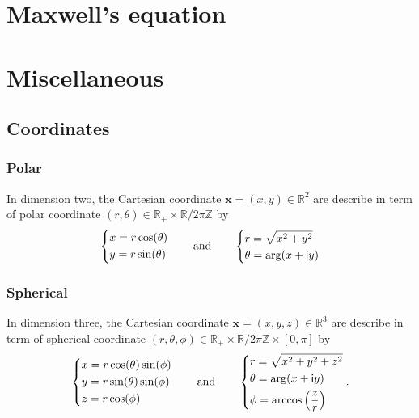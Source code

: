 \documentclass[12pt,a4paper]{article}
\theoremstyle{definition}
\theoremstyle{plain}
\theoremstyle{remark}
\newcommand{\bbR}{\mathbb{R}}
\newcommand{\bbZ}{\mathbb{Z}}
\newcommand{\im}{\mathsf{i}}
\newcommand{\plr}[1]{\left(#1\right)}
\newcommand{\vx}{\boldsymbol{x}}
\begin{document}
\section{Maxwell's equation}

\appendix

\section{Miscellaneous}

\subsection{Coordinates}

%
\subsubsection{Polar}
%

In dimension two, the Cartesian coordinate \(\vx = (x, y) \in \bbR^2\) are describe in term of polar coordinate \((r, \theta) \in \bbR_+ \times \bbR / 2\pi\bbZ\) by
\[
    \begin{dcases}
        x = r \cos(\theta) \\
        y = r \sin(\theta)
    \end{dcases} \qquad
    \text{and} \qquad
    \begin{dcases}
        r = \sqrt{x^2 + y^2} \\
        \theta = \arg(x + \im y)
    \end{dcases}
\]

%
\subsubsection{Spherical}
%

In dimension three, the Cartesian coordinate \(\vx = (x, y, z) \in \bbR^3\) are describe in term of spherical coordinate \((r, \theta, \phi) \in \bbR_+ \times \bbR / 2\pi\bbZ \times [0, \pi]\) by
\[
    \begin{dcases}
        x = r \cos(\theta) \sin(\phi) \\
        y = r \sin(\theta) \sin(\phi) \\
        z = r \cos(\phi)
    \end{dcases} \qquad
    \text{and} \qquad
    \begin{dcases}
        r = \sqrt{x^2 + y^2 + z^2} \\
        \theta = \arg(x + \im y)   \\
        \phi = \arccos\plr{\frac{z}{r}}
    \end{dcases}.
\]
\end{document}
